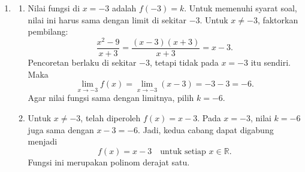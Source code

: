 \documentclass[10pt,letterpaper]{article}
\newcommand{\R}{\mathbb{R}}
\begin{document}
\begin{enumerate}
\begin{enumerate}
          \item Gunakan pilihan $D_f=[2,\infty)$ terlebih dahulu.
                Misalkan $y=(x-2)^2-4$.
                Karena $x\ge2$, nilai $x-2$ tak negatif, sehingga pilih akar positif:
                \begin{align*}
                  y+4        & =(x-2)^2,      \\
                  \sqrt{y+4} & =x-2,          \\
                  x          & =2+\sqrt{y+4}.
                \end{align*}
                Tukar nama variabel untuk menulis rumus invers:
                \[
                  \boxed{f^{-1}(x)=2+\sqrt{x+4}}.
                \]
                Domain invers adalah range fungsi semula, yaitu $[-4,\infty)$.
                Range invers adalah domain fungsi semula, yaitu $[2,\infty)$.
                Jadi,
                \[
                  \boxed{D_{f^{-1}}=[-4,\infty),\qquad R_{f^{-1}}=[2,\infty)}.
                \]
                Jika pada (a) dipilih sisi kiri $D_f=(-\infty,2]$, maka $x-2\le0$.
                Cabang akarnya menjadi $x-2=-\sqrt{y+4}$.
                Untuk pilihan ini, hasilnya adalah
                \[
                  \boxed{f^{-1}(x)=2-\sqrt{x+4}},
                  \qquad D_{f^{-1}}=[-4,\infty),\quad R_{f^{-1}}=(-\infty,2].
                \]
                Tanda akar pada rumus invers harus mengikuti pembatasan domain yang dipilih.
        \end{enumerate}

        \newpage

  \item \begin{enumerate}
          \item Nilai fungsi di $x=-3$ adalah $f(-3)=k$.
                Untuk memenuhi syarat soal, nilai ini harus sama dengan limit di sekitar $-3$.
                Untuk $x\ne-3$, faktorkan pembilang:
                \[
                  \frac{x^2-9}{x+3}
                  =\frac{(x-3)(x+3)}{x+3}=x-3.
                \]
                Pencoretan berlaku di sekitar $-3$, tetapi tidak pada $x=-3$ itu sendiri.
                Maka
                \[
                  \lim_{x\to-3}f(x)=\lim_{x\to-3}(x-3)=-3-3=-6.
                \]
                Agar nilai fungsi sama dengan limitnya, pilih $\boxed{k=-6}$.

          \item Untuk $x\ne-3$, telah diperoleh $f(x)=x-3$.
                Pada $x=-3$, nilai $k=-6$ juga sama dengan $x-3=-6$.
                Jadi, kedua cabang dapat digabung menjadi
                \[
                  \boxed{f(x)=x-3\quad\text{untuk setiap }x\in\R}.
                \]
                Fungsi ini merupakan polinom derajat satu.
        \end{enumerate}


\end{enumerate}
\end{document}
